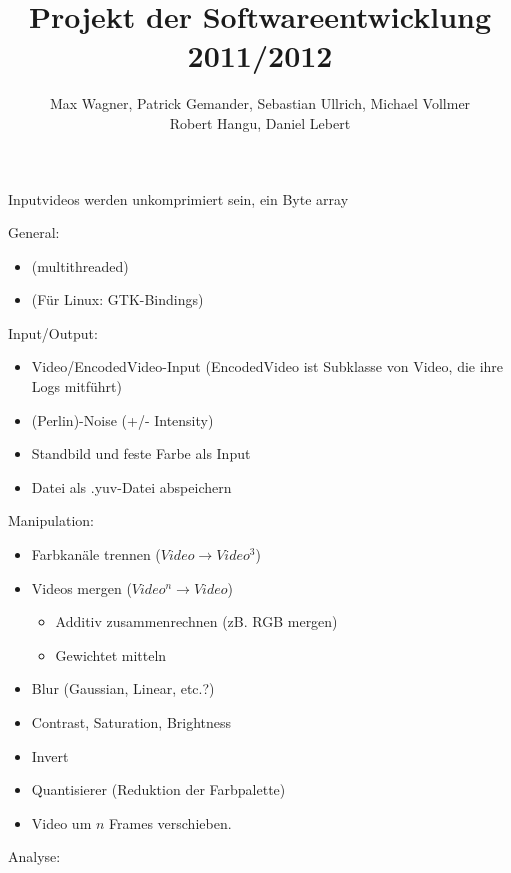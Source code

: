 \documentclass{article}
\begin{document}
\title{Projekt der Softwareentwicklung 2011/2012}
\author{Max Wagner, Patrick Gemander, Sebastian Ullrich, Michael Vollmer \\ Robert Hangu, Daniel Lebert}
\maketitle
Inputvideos werden unkomprimiert sein, ein Byte array

General:
\begin{itemize}
  \item (multithreaded)
  \item (Für Linux: GTK-Bindings)
\end{itemize}
Input/Output:
\begin{itemize}
  \item Video/EncodedVideo-Input (EncodedVideo ist Subklasse von Video, die ihre Logs mitführt)
  \item (Perlin)-Noise (+/- Intensity)
  \item Standbild und feste Farbe als Input
  \item Datei als .yuv-Datei abspeichern
\end{itemize}
Manipulation:
\begin{itemize}
  \item Farbkanäle trennen ($Video \rightarrow Video^3$)
  \item Videos mergen ($Video^n \rightarrow Video$)
\begin{itemize}
    \item Additiv zusammenrechnen (zB. RGB mergen)
    \item Gewichtet mitteln
\end{itemize}
  \item Blur (Gaussian, Linear, etc.?)
  \item Contrast, Saturation, Brightness
  \item Invert
  \item Quantisierer (Reduktion der Farbpalette)
  \item Video um $n$ Frames verschieben.
\end{itemize}
Analyse:
\end{document}
